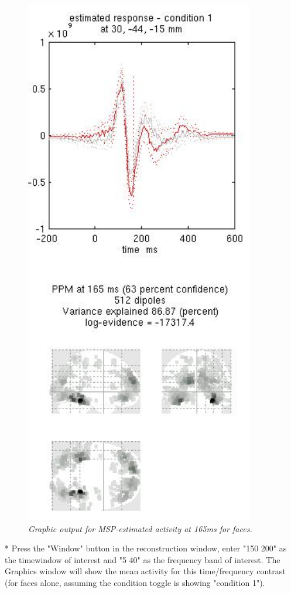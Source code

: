 \begin{figure}
\begin{center}
\includegraphics[width=100mm]{multimodal/figures/figure_32_18}
\caption{\em  Graphic output for MSP-estimated activity at 165ms for faces.\label{fig_32_18}}
\end{center}
\end{figure}

* Press the "Window" button in the reconstruction window, enter "150 200" as the timewindow of interest and "5 40" as the frequency band of interest. The Graphics window will show the mean activity for this time/frequency contrast (for faces alone, assuming the condition toggle is showing "condition 1").

